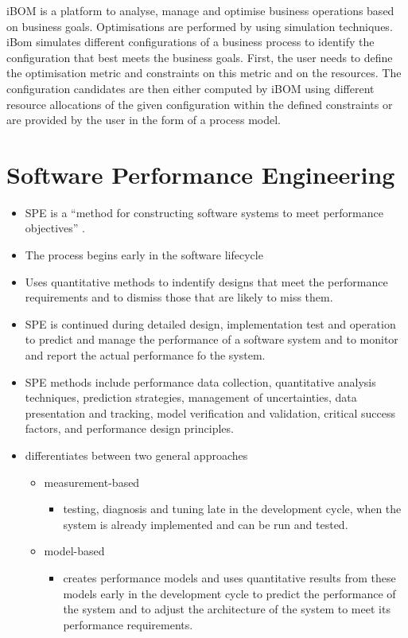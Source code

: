 iBOM \citep{Castellanos:2005fk} is a platform to analyse, manage and optimise business operations based on business goals. Optimisations are performed by using simulation techniques. iBom simulates different configurations of a business process to identify the configuration that best meets the business goals. First, the user needs to define the optimisation metric and constraints on this metric and on the resources. The configuration candidates are then either computed by iBOM using different resource allocations of the given configuration within the defined constraints or are provided by the user in the form of a process model. 

\section{Software Performance Engineering}

\begin{itemize}
	\item \ac{SPE} is a ``method for constructing software systems to meet performance objectives'' \citep{Smith:1990aa}.
	\item The process begins early in the software lifecycle
	\item Uses quantitative methods to indentify designs that meet the performance requirements and to dismiss those that are likely to miss them.
	\item \ac{SPE} is continued during detailed design, implementation test and operation to predict and manage the performance of a software system and to monitor and report the actual performance fo the system.
	\item \ac{SPE} methods include performance data collection, quantitative analysis techniques, prediction strategies, management of uncertainties, data presentation and tracking, model verification and validation, critical success factors, and performance design principles. 
	\item \citep{Woodside:2007aa} differentiates between two general approaches
	\begin{itemize}
		\item measurement-based
		\begin{itemize}
			\item testing, diagnosis and tuning late in the development cycle, when the system is already implemented and can be run and tested.
		\end{itemize}
		\item model-based
		\begin{itemize}
			\item creates performance models and uses quantitative results from these models early in the development cycle to predict the performance of the system and to adjust the architecture of the system to meet its performance requirements.
		\end{itemize}
	\end{itemize}
\end{itemize}

